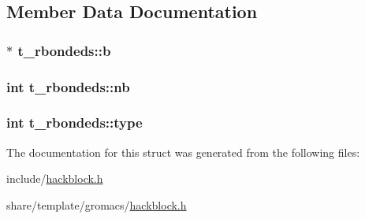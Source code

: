\subsection{\-Member \-Data \-Documentation}
\hypertarget{structt__rbondeds_aad8a8e039ee5ab741b8705da1162e081}{
\subsubsection[{b}]{ $\ast$ {\bf t\-\_\-rbondeds\-::b}}}\label{structt__rbondeds_aad8a8e039ee5ab741b8705da1162e081}
\hypertarget{structt__rbondeds_a128fad253a8fb95a02ef35dcfe03b3d0}{
\subsubsection[{nb}]{\setlength{\rightskip}{0pt plus 5cm}int {\bf t\-\_\-rbondeds\-::nb}}}\label{structt__rbondeds_a128fad253a8fb95a02ef35dcfe03b3d0}
\hypertarget{structt__rbondeds_a023e82065b774845a28fc6b23619a8df}{
\subsubsection[{type}]{\setlength{\rightskip}{0pt plus 5cm}int {\bf t\-\_\-rbondeds\-::type}}}\label{structt__rbondeds_a023e82065b774845a28fc6b23619a8df}


\-The documentation for this struct was generated from the following files\-:\begin{DoxyCompactItemize}
\item 
include/\hyperlink{include_2hackblock_8h}{hackblock.\-h}\item 
share/template/gromacs/\hyperlink{share_2template_2gromacs_2hackblock_8h}{hackblock.\-h}\end{DoxyCompactItemize}

